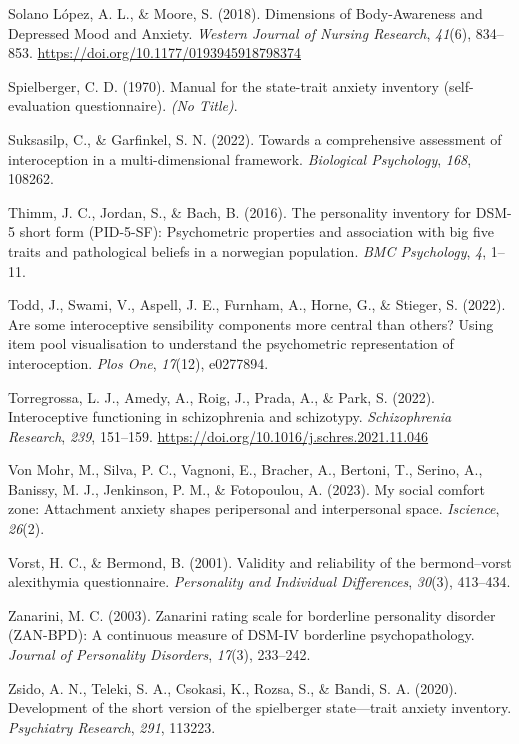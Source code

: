\documentclass[
  man,
  floatsintext,
  longtable,
  nolmodern,
  notxfonts,
  notimes,
  colorlinks=true,linkcolor=blue,citecolor=blue,urlcolor=blue]{apa7}
\newlength{\cslhangindent}
\newenvironment{CSLReferences}[2] %
 {\begin{list}{}{%
  \setlength{\itemindent}{0pt}
  \setlength{\leftmargin}{0pt}
  \setlength{\parsep}{0pt}
  \ifodd #1
   \setlength{\leftmargin}{\cslhangindent}
   \setlength{\itemindent}{-1\cslhangindent}
  \fi
  \setlength{\itemsep}{#2\baselineskip}}}
 {\end{list}}
\begin{document}
\begin{CSLReferences}{1}{0}
Solano López, A. L., \& Moore, S. (2018). Dimensions of Body-Awareness
and Depressed Mood and Anxiety. \emph{Western Journal of Nursing
Research}, \emph{41}(6), 834--853.
\url{https://doi.org/10.1177/0193945918798374}

Spielberger, C. D. (1970). Manual for the state-trait anxiety inventory
(self-evaluation questionnaire). \emph{(No Title)}.

Suksasilp, C., \& Garfinkel, S. N. (2022). Towards a comprehensive
assessment of interoception in a multi-dimensional framework.
\emph{Biological Psychology}, \emph{168}, 108262.

Thimm, J. C., Jordan, S., \& Bach, B. (2016). The personality inventory
for DSM-5 short form (PID-5-SF): Psychometric properties and association
with big five traits and pathological beliefs in a norwegian population.
\emph{BMC Psychology}, \emph{4}, 1--11.

Todd, J., Swami, V., Aspell, J. E., Furnham, A., Horne, G., \& Stieger,
S. (2022). Are some interoceptive sensibility components more central
than others? Using item pool visualisation to understand the
psychometric representation of interoception. \emph{Plos One},
\emph{17}(12), e0277894.

Torregrossa, L. J., Amedy, A., Roig, J., Prada, A., \& Park, S. (2022).
Interoceptive functioning in schizophrenia and schizotypy.
\emph{Schizophrenia Research}, \emph{239}, 151--159.
\url{https://doi.org/10.1016/j.schres.2021.11.046}

Von Mohr, M., Silva, P. C., Vagnoni, E., Bracher, A., Bertoni, T.,
Serino, A., Banissy, M. J., Jenkinson, P. M., \& Fotopoulou, A. (2023).
My social comfort zone: Attachment anxiety shapes peripersonal and
interpersonal space. \emph{Iscience}, \emph{26}(2).

Vorst, H. C., \& Bermond, B. (2001). Validity and reliability of the
bermond--vorst alexithymia questionnaire. \emph{Personality and
Individual Differences}, \emph{30}(3), 413--434.

Zanarini, M. C. (2003). Zanarini rating scale for borderline personality
disorder (ZAN-BPD): A continuous measure of DSM-IV borderline
psychopathology. \emph{Journal of Personality Disorders}, \emph{17}(3),
233--242.

Zsido, A. N., Teleki, S. A., Csokasi, K., Rozsa, S., \& Bandi, S. A.
(2020). Development of the short version of the spielberger
state---trait anxiety inventory. \emph{Psychiatry Research}, \emph{291},
113223.

\end{CSLReferences}
\end{document}
